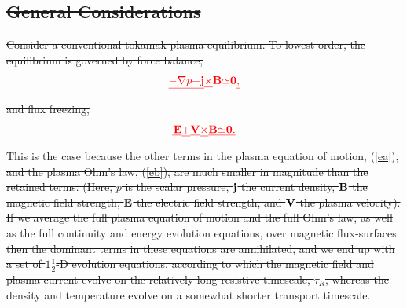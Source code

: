 \documentclass[12pt,prb,aps]{revtex4-1}
\providecommand{\DIFdel}[1]{{\protect\color{red}\sout{#1}}}                      %
\begin{document}
\subsection{\DIFdel{General Considerations}}%
\addtocounter{subsection}{-1}%
\DIFdel{Consider a conventional tokamak plasma equilibrium. To lowest order, the equilibrium is governed by force balance,
}\begin{displaymath}\DIFdel{%
-\nabla p + }{\DIFdel{\bf j}}\DIFdel{\times }{\DIFdel{\bf B}} \DIFdel{\simeq }{\DIFdel{\bf 0}}\DIFdel{,
}\end{displaymath}%
\DIFdel{and
flux freezing,
}\begin{displaymath}\DIFdel{%
}{\DIFdel{\bf E}} \DIFdel{+ }{\DIFdel{\bf V}}\DIFdel{\times }{\DIFdel{\bf B}} \DIFdel{\simeq }{\DIFdel{\bf 0}}\DIFdel{.
}\end{displaymath}%
\DIFdel{This is the case because the other terms in the plasma equation of motion,
(\ref{ea}), and the plasma Ohm's law, (\ref{eb}), are much
smaller in magnitude than the retained terms. (Here, $p$ is the
scalar pressure, ${\bf j}$ the current density, ${\bf B}$ the
magnetic field strength, ${\bf E}$ the electric field strength, and ${\bf V}$ the plasma velocity). If we average the full plasma equation of motion and the full Ohm's law, as well as the full continuity and energy evolution equations, over magnetic flux-surfaces
then the dominant terms in these equations are annihilated, and
we end up with a set of $1\tfrac{1}{2}$-D evolution equations,
according to which the magnetic field and plasma current
evolve on the relatively long resistive timescale, $\tau_R$,
whereas the density and temperature evolve on a somewhat
shorter transport timescale.\mbox{%
\cite{transp,gim}
}\hspace{0pt}%
}%
\end{document}
